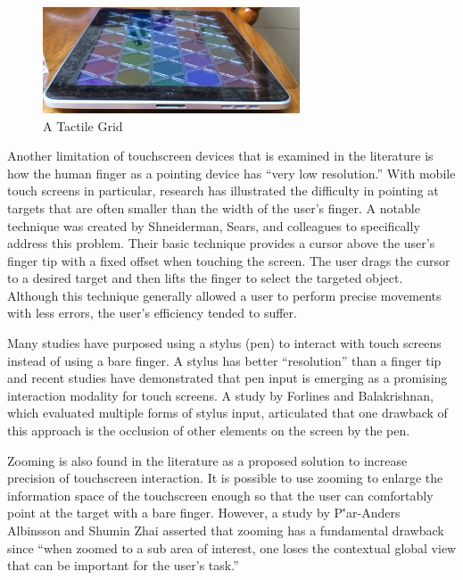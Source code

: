 \documentclass[11pt]{article}
\begin{document}
\begin{figure}[ht]
\centering
\includegraphics[width=3in]{TactileGrid.jpg} 
\caption{A Tactile Grid}
\label{tactile-grid}
\end{figure}

Another limitation of touchscreen devices that is examined in the literature is how the human finger as a pointing device has ``very low resolution.''\cite{Albinsson} With mobile touch screens in particular, research has illustrated the difficulty in pointing at targets that are often smaller than the width of the user's finger. A notable technique was created by Shneiderman, Sears, and colleagues to specifically address this problem.\cite{Sears} Their basic technique provides a cursor above the user's finger tip with a fixed offset when touching the screen. The user drags the cursor to a desired target and then lifts the finger to select the targeted object. Although this technique generally allowed a user to perform precise movements with less errors, the user's efficiency tended to suffer.\cite{Sears}

Many studies have purposed using a stylus (pen) to interact with touch screens instead of using a bare finger. A stylus has better ``resolution'' than a finger tip and recent studies have demonstrated that pen input is emerging as a promising interaction modality for touch screens.\cite{Bi} A study by Forlines and Balakrishnan, which evaluated multiple forms of stylus input, articulated that one drawback of this approach is the occlusion of other elements on the screen by the pen.\cite{Forlines}

Zooming is also found in the literature as a proposed solution to increase precision of touchscreen interaction. It is possible to use zooming to enlarge the information space of the touchscreen enough so that the user can comfortably point at the target with a bare finger. However, a study by P\''{a}r-Anders Albinsson and Shumin Zhai asserted that zooming has a fundamental drawback since ``when zoomed to a sub area of interest, one loses the contextual global view that can be important for the user's task.''\cite{Albinsson} 
\end{document}
